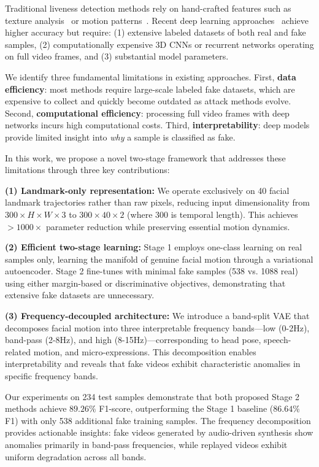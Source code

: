 \documentclass{article}
\begin{document}
Traditional liveness detection methods rely on hand-crafted features such as texture analysis~\citep{maatta2011face} or motion patterns~\citep{kollreider2007evaluating}. Recent deep learning approaches~\citep{liu2018learning, george2019deep} achieve higher accuracy but require: (1) extensive labeled datasets of both real and fake samples, (2) computationally expensive 3D CNNs or recurrent networks operating on full video frames, and (3) substantial model parameters.

We identify three fundamental limitations in existing approaches. First, \textbf{data efficiency}: most methods require large-scale labeled fake datasets, which are expensive to collect and quickly become outdated as attack methods evolve. Second, \textbf{computational efficiency}: processing full video frames with deep networks incurs high computational costs. Third, \textbf{interpretability}: deep models provide limited insight into \emph{why} a sample is classified as fake.

In this work, we propose a novel two-stage framework that addresses these limitations through three key contributions:

\textbf{(1) Landmark-only representation:} We operate exclusively on 40 facial landmark trajectories rather than raw pixels, reducing input dimensionality from $300 \times H \times W \times 3$ to $300 \times 40 \times 2$ (where 300 is temporal length). This achieves $>1000\times$ parameter reduction while preserving essential motion dynamics.

\textbf{(2) Efficient two-stage learning:} Stage 1 employs one-class learning on real samples only, learning the manifold of genuine facial motion through a variational autoencoder. Stage 2 fine-tunes with minimal fake samples (538 vs. 1088 real) using either margin-based or discriminative objectives, demonstrating that extensive fake datasets are unnecessary.

\textbf{(3) Frequency-decoupled architecture:} We introduce a band-split VAE that decomposes facial motion into three interpretable frequency bands—low (0-2Hz), band-pass (2-8Hz), and high (8-15Hz)—corresponding to head pose, speech-related motion, and micro-expressions. This decomposition enables interpretability and reveals that fake videos exhibit characteristic anomalies in specific frequency bands.

Our experiments on 234 test samples demonstrate that both proposed Stage 2 methods achieve $89.26\%$ F1-score, outperforming the Stage 1 baseline ($86.64\%$ F1) with only 538 additional fake training samples. The frequency decomposition provides actionable insights: fake videos generated by audio-driven synthesis show anomalies primarily in band-pass frequencies, while replayed videos exhibit uniform degradation across all bands.
\end{document}
